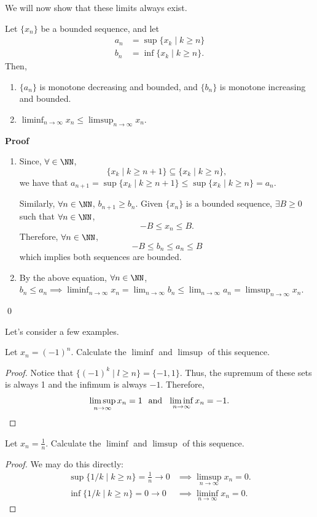We will now show that these limits always exist.
\begin{theorem}
Let $\{x_n\}$ be a bounded sequence, and let 
\begin{align*}
    a_n &= \sup\{x_k \mid k\geq n\} \\
    b_n &= \inf\{x_k \mid k\geq n\}.
\end{align*}
Then, 
\begin{enumerate}
    \item $\{a_n\}$ is monotone decreasing and bounded, and $\{b_n\}$ is monotone increasing and bounded.
    \item $\liminf_{n\to \infty} x_n \leq \limsup_{n\to \infty} x_n$.
\end{enumerate} 
\end{theorem}
\textbf{Proof}
\begin{enumerate}
    \item Since, $\forall \in \NN$, 
    \[
    \{x_k \mid k\geq n+1\} \subseteq \{x_k \mid k \geq n\},
    \]
    we have that $a_{n+1}= \sup\{x_k\mid k\geq n+1\} \leq \sup\{x_k \mid k\geq n\} = a_n$.
    
    Similarly, $\forall n \in \NN$, $b_{n+1} \geq b_n$. Given $\{x_n\}$ is a bounded sequence, $\exists B \geq 0$ such that $\forall n\in \NN$,
    \[
    -B \leq x_n \leq B.
    \]
    Therefore, $\forall n\in \NN$, 
    \[
    -B \leq b_n \leq a_n \leq B
    \]
    which implies both sequences are bounded. 
    \item By the above equation, $\forall n\in \NN$, $b_n \leq a_n \implies \liminf_{n\to \infty} x_n = \lim_{n\to \infty} b_n \leq \lim_{n\to \infty} a_n = \limsup_{n\to \infty} x_n.$
\end{enumerate}
\qed 

\noindent Let's consider a few examples.
\begin{example}
Let $x_n = (-1)^n$. Calculate the $\liminf$ and $\limsup$ of this sequence.
\end{example}
\begin{proof}
Notice that $\{(-1)^k \mid l\geq n\} = \{-1,1\}$. Thus, the supremum of these sets is always 1 and the infimum is always $-1$. Therefore, 
\[
\limsup_{n\to \infty} x_n = 1 \hspace{.25cm} \text{and} \hspace{.25cm} \liminf_{n\to \infty} x_n = -1.
\]
\end{proof}

\begin{example}
Let $x_n = \frac{1}{n}$. Calculate the $\liminf$ and $\limsup$ of this sequence.
\end{example}
\begin{proof}
We may do this directly:
\begin{align*}
    \sup\{1/k \mid k\geq n\} = \frac{1}{n}\to 0 &\implies \limsup_{n\to \infty} x_n = 0. \\
    \inf\{1/k\mid k \geq n\} = 0 \to 0 &\implies \liminf_{n\to \infty} x_n = 0.
\end{align*}
\end{proof}

